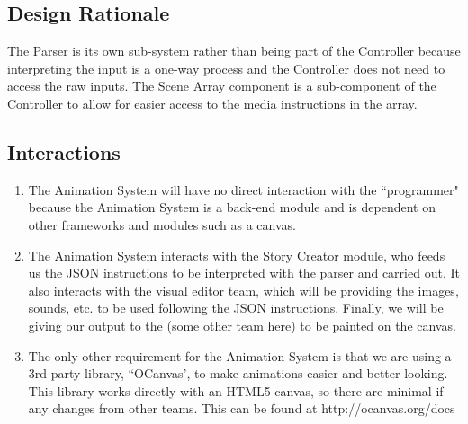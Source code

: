 \documentclass[12pt]{article}
\begin{document}
\noindent\subsection{Design Rationale}
The Parser is its own sub-system rather than being part of the Controller because interpreting the input is a one-way process and the Controller does not need to access the raw inputs. The Scene Array component is a sub-component of the Controller to allow for easier access to the media instructions in the array.


\noindent\subsection {Interactions}
\begin{enumerate}
\item The Animation System will have no direct interaction with the ``programmer" because the Animation System is a back-end module and is dependent on other frameworks and modules such as a canvas.
\item The Animation System interacts with the Story Creator module, who feeds us the JSON instructions to be interpreted with the parser and carried out. It also interacts with the visual editor team, which will be providing the images, sounds, etc. to be used following the JSON instructions. Finally, we will be giving our output to the (some other team here) to be painted on the canvas.
\item The only other requirement for the Animation System is that we are using a 3rd party library, ``OCanvas', to make animations easier and better looking. This library works directly with an HTML5 canvas, so there are minimal if any changes from other teams. This can be found at http://ocanvas.org/docs

\end{enumerate}
\end{document}
